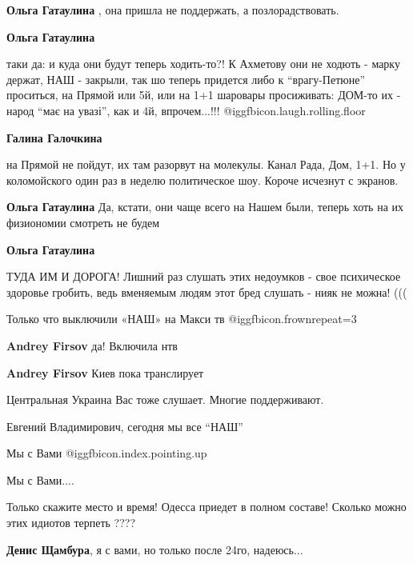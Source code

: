\begin{itemize}
\begin{itemize} %
\textbf{Ольга Гатаулина} , она пришла не поддержать, а позлорадствовать.

\textbf{Ольга Гатаулина} 

таки да: и куда они будут теперь ходить-то?! К Ахметову они не ходють - марку
держат, НАШ - закрыли, так шо теперь придется либо к \enquote{врагу-Петюне} проситься,
на Прямой или 5й, или на 1+1 шаровары просиживать: ДОМ-то их - народ \enquote{має на
увазі}, как и 4й, впрочем...!!!  @igg{fbicon.laugh.rolling.floor} 

\textbf{Галина Галочкина} 

на Прямой не пойдут, их там разорвут на молекулы. Канал Рада, Дом, 1+1. Но у
коломойского один раз в неделю политическое шоу. Короче исчезнут с экранов.

\textbf{Ольга Гатаулина} Да, кстати, они чаще всего на Нашем были, теперь хоть на их физиономии смотреть не будем

\textbf{Ольга Гатаулина} 

ТУДА ИМ И ДОРОГА! Лишний раз слушать этих недоумков - свое психическое здоровье
гробить, ведь вменяемым людям этот бред слушать - нияк не можна! (((

\end{itemize} %

Только что выключили «НАШ» на Макси тв @igg{fbicon.frown}{repeat=3} 

\begin{itemize} %
\textbf{Andrey Firsov} да! Включила нтв

\textbf{Andrey Firsov} Киев пока транслирует
\end{itemize} %

Центральная Украина Вас тоже слушает. Многие поддерживают.

Евгений Владимирович, сегодня мы все \enquote{НАШ}

Мы с Вами @igg{fbicon.index.pointing.up}

Мы с Вами....

Только скажите место и время! Одесса приедет в полном составе! Сколько можно этих идиотов терпеть ????

\textbf{Денис Щамбура}, я с вами, но только после 24го, надеюсь...


\end{itemize}
